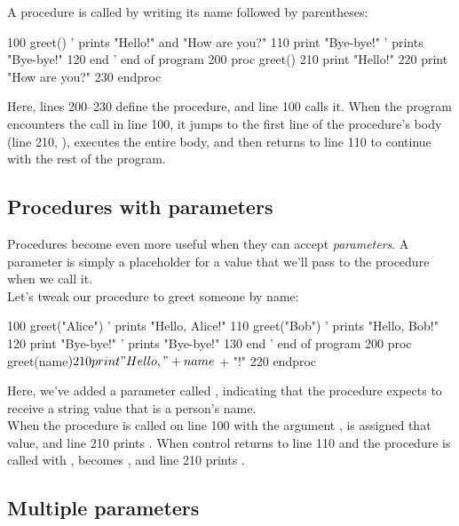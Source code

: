 A procedure is called by writing its name followed by parentheses:

\begin{lst}
100 greet()           ' prints "Hello!" and "How are you?"
110 print "Bye-bye!"  ' prints "Bye-bye!"
120 end               ' end of program
200 proc greet()
210   print "Hello!"
220   print "How are you?"
230 endproc
\end{lst}

Here, lines 200–230 define the procedure, and line 100 calls it. When the program encounters the  call in line 100, it jumps to the first line of the procedure’s body (line 210, ), executes the entire body, and then returns to line 110 to continue with the rest of the program.

\subsection*{Procedures with parameters}

Procedures become even more useful when they can accept \emph{parameters}. A parameter is simply a placeholder for a value that we'll pass to the procedure when we call it.\\

Let’s tweak our  procedure to greet someone by name:

\begin{lst}
100 greet("Alice")    ' prints "Hello, Alice!"
110 greet("Bob")      ' prints "Hello, Bob!"
120 print "Bye-bye!"  ' prints "Bye-bye!"
130 end               ' end of program
200 proc greet(name$)
210   print "Hello, " + name$ + "!"
220 endproc
\end{lst}

Here, we’ve added a parameter called , indicating that the procedure expects to receive a string value that is a person's name.\\

When the procedure is called on line 100 with the argument ,  is assigned that value, and line 210 prints . When control returns to line 110 and the procedure is called with ,  becomes , and line 210 prints .

\subsection*{Multiple parameters}

